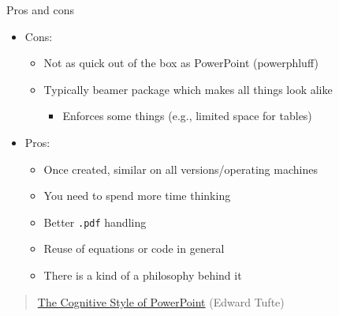 \documentclass[ignorenonframetext,]{beamer}
\begin{document}
\begin{frame}{Pros and cons}

\begin{itemize}
\item
  Cons:

  \begin{itemize}
  \itemsep1pt\parskip0pt
  \item
    Not as quick out of the box as PowerPoint (powerphluff)
  \item
    Typically beamer package which makes all things look alike

    \begin{itemize}
    \itemsep1pt\parskip0pt
    \item
      Enforces some things (e.g., limited space for tables)
    \end{itemize}
  \end{itemize}
\item
  Pros:

  \begin{itemize}
  \itemsep1pt\parskip0pt
  \item
    Once created, similar on all versions/operating machines
  \item
    You need to spend more time thinking
  \item
    Better \texttt{.pdf} handling
  \item
    Reuse of equations or code in general
  \item
    There is a kind of a philosophy behind it
  \end{itemize}
\end{itemize}

\begin{quote}
\href{http://users.ha.uth.gr/tgd/pt0501/09/Tufte.pdf}{The Cognitive
Style of PowerPoint} (Edward Tufte)
\end{quote}

\end{frame}
\end{document}
